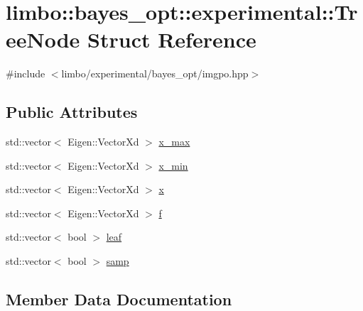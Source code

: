 \hypertarget{structlimbo_1_1bayes__opt_1_1experimental_1_1_tree_node}{}\section{limbo\+:\+:bayes\+\_\+opt\+:\+:experimental\+:\+:Tree\+Node Struct Reference}
\label{structlimbo_1_1bayes__opt_1_1experimental_1_1_tree_node}


{\ttfamily \#include $<$limbo/experimental/bayes\+\_\+opt/imgpo.\+hpp$>$}

\subsection*{Public Attributes}
\begin{DoxyCompactItemize}
\item 
std\+::vector$<$ Eigen\+::\+Vector\+Xd $>$ \hyperlink{structlimbo_1_1bayes__opt_1_1experimental_1_1_tree_node_a3948f2f233995ce1cd4b36d3944b27b9}{x\+\_\+max}
\item 
std\+::vector$<$ Eigen\+::\+Vector\+Xd $>$ \hyperlink{structlimbo_1_1bayes__opt_1_1experimental_1_1_tree_node_a09ee8e7b77c04a859ecdc253329303f4}{x\+\_\+min}
\item 
std\+::vector$<$ Eigen\+::\+Vector\+Xd $>$ \hyperlink{structlimbo_1_1bayes__opt_1_1experimental_1_1_tree_node_a790ebef4a33235acf40cf745599c4afe}{x}
\item 
std\+::vector$<$ Eigen\+::\+Vector\+Xd $>$ \hyperlink{structlimbo_1_1bayes__opt_1_1experimental_1_1_tree_node_a5c863b76ba45e3eefd34b8a284f7a892}{f}
\item 
std\+::vector$<$ bool $>$ \hyperlink{structlimbo_1_1bayes__opt_1_1experimental_1_1_tree_node_a69aca1e19bb631e4a5fee776f6965cd9}{leaf}
\item 
std\+::vector$<$ bool $>$ \hyperlink{structlimbo_1_1bayes__opt_1_1experimental_1_1_tree_node_a6f0c0d02a8129c2bd08ba8ecc1f9f0f1}{samp}
\end{DoxyCompactItemize}


\subsection{Member Data Documentation}
\hypertarget{structlimbo_1_1bayes__opt_1_1experimental_1_1_tree_node_a5c863b76ba45e3eefd34b8a284f7a892}{}
